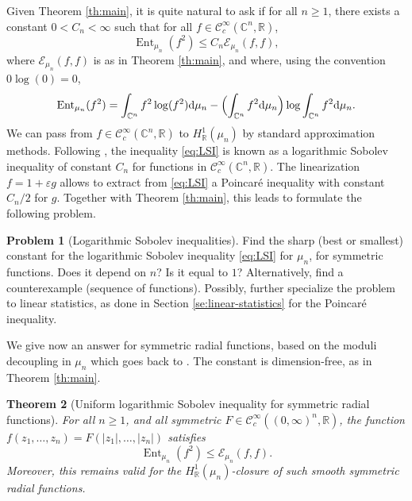 \documentclass[11pt,reqno]{amsart}
\numberwithin{equation}{section}%
\numberwithin{figure}{section}%
\numberwithin{table}{section}
\theoremstyle{plain}
\newtheorem{theorem}{Theorem}[section]
\theoremstyle{definition}
\newtheorem{problem}[theorem]{Problem}
\begin{document}
Given Theorem \ref{th:main}, it is quite natural to ask if for all $n\geq1$,
there exists a constant $0<C_n<\infty$ such that for all
$f\in\mathcal{C}^\infty_c(\mathbb{C}^n,\mathbb{R})$,
\begin{equation}\label{eq:LSI}
  \operatorname{Ent}_{\mu_n}(f^2)\leq C_n\mathcal{E}_{\mu_n}(f,f),
\end{equation}
where $\mathcal{E}_{\mu_n}(f,f)$ is as in Theorem \ref{th:main}, and where, using the convention $0\log(0)=0$,
\begin{equation}
  \operatorname{Ent}_{\mu_n}(f^2)
  =\int_{\mathbb{C}^n}f^2\log(f^2)\mathrm{d}\mu_n
  -\Bigl(\int_{\mathbb{C}^n}f^2\mathrm{d}\mu_n\Bigr)\log\int_{\mathbb{C}^n}f^2\mathrm{d}\mu_n.
\end{equation}
We can pass from $f\in\mathcal{C}^\infty_c(\mathbb{C}^n,\mathbb{R})$ to
$H^1_{\mathbb{R}}(\mu_n)$ by standard approximation methods. Following
\cite{Gross}, the inequality \eqref{eq:LSI} is known as a logarithmic Sobolev
inequality of constant $C_n$ for functions in
$\mathcal{C}^\infty_c(\mathbb{C}^n,\mathbb{R})$. The linearization
$f=1+\varepsilon g$ allows to extract from \eqref{eq:LSI} a Poincaré
inequality with constant $C_n/2$ for $g$. Together with Theorem \ref{th:main},
this leads to formulate the following problem.

\begin{problem}[Logarithmic Sobolev inequalities]\label{pb:lsi}
  Find the sharp (best or smallest) constant for the logarithmic Sobolev
  inequality \eqref{eq:LSI} for $\mu_n$, for symmetric functions. Does it
  depend on $n$? Is it equal to $1$? Alternatively, find a counterexample
  (sequence of functions). Possibly, further specialize the problem to linear
  statistics, as done in Section \ref{se:linear-statistics} for the Poincaré
  inequality.
\end{problem}

We give now an answer for symmetric radial functions, based on the moduli
decoupling in $\mu_n$ which goes back to \cite{Kostlan}. The constant is
dimension-free, as in Theorem \ref{th:main}.

\begin{theorem}[Uniform logarithmic Sobolev inequality for symmetric radial functions]\label{th:rlsi}
  For all $n\geq1$, and all symmetric
  $F\in\mathcal{C}^\infty_c((0,\infty)^n,\mathbb{R})$, the function
  $f(z_1,\ldots,z_n)=F(|z_1|,\ldots,|z_n|)$ satisfies
  \begin{equation}\label{eq:rlsi}
    \operatorname{Ent}_{\mu_n}(f^2)
    \leq
    \mathcal{E}_{\mu_n}(f,f).
  \end{equation}
  Moreover, this remains valid for the $H^1_{\mathbb{R}}(\mu_n)$-closure of
  such smooth symmetric radial functions.
\end{theorem}
\end{document}
